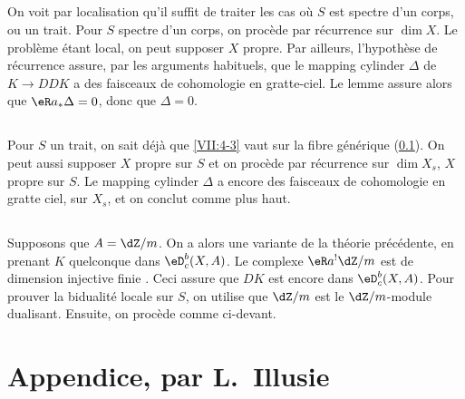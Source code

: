 \subsection{}\label{VII:4-5}

On voit par localisation qu'il suffit de traiter les cas où $S$ est spectre 
d'un corps, ou un trait. Pour $S$ spectre d'un corps, on procède par 
récurrence sur $\dim X$. Le problème étant local, on peut supposer $X$ 
propre. Par ailleurs, l'hypothèse de récurrence assure, par les arguments 
habituels, que le mapping cylinder $\Delta$ de $K\to D D K$ a des faisceaux de 
cohomologie en gratte-ciel. Le lemme assure alors que $\eR a_\ast \Delta=0$, 
donc que $\Delta=0$. 





\subsection{}\label{VII:4-6}

Pour $S$ un trait, on sait déjà que \ref{VII:4-3} vaut sur la fibre 
générique (\ref{VII:4-5}). On peut aussi supposer $X$ propre sur $S$ et on 
procède par récurrence sur $\dim{X_s}$, $X$ propre sur $S$. Le mapping 
cylinder $\Delta$ a encore des faisceaux de cohomologie en gratte ciel, sur 
$X_s$, et on conclut comme plus haut. 





\subsection{}\label{VII:4-7}

Supposons que $A=\dZ/m$. On a alors une variante de la théorie 
précédente, en prenant $K$ quelconque dans $\eD_c^b(X,A)$. Le complexe 
$\eR a^! \dZ/m$ est de dimension injective finie \cite[XVIII 3.1.7]{sga4}. Ceci 
assure que $D K$ est encore dans $\eD_c^b(X,A)$. Pour prouver la bidualité 
locale sur $S$, on utilise que $\dZ/m$ est le $\dZ/m$-module dualisant. 
Ensuite, on procède comme ci-devant. 










\section{Appendice, par L.\ Illusie}\label{VII:5}

